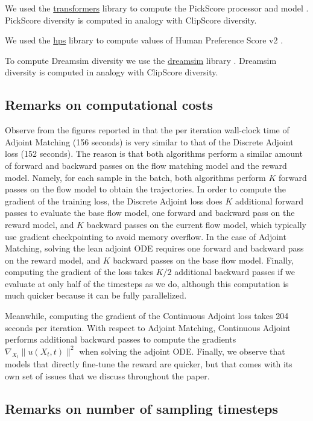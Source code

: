 We used the \url{transformers} library to compute the PickScore processor and model \citep{kirstain2023pickapic}. PickScore diversity is computed in analogy with ClipScore diversity.

We used the \url{hps} library to compute values of Human Preference Score v2 \citep{wu2023human}.

To compute Dreamsim diversity we use the \url{dreamsim} library \citep{fu2023learning}. Dreamsim diversity is computed in analogy with ClipScore diversity.

\subsection{Remarks on computational costs} \label{subsec:remarks_computational_cost}
Observe from the figures reported in  that the per iteration wall-clock time of Adjoint Matching (156 seconds) is very similar to that of the Discrete Adjoint loss (152 seconds). The reason is that both algorithms perform a similar amount of forward and backward passes on the flow matching model and the reward model. Namely, for each sample in the batch, both algorithms perform $K$ forward passes on the flow model to obtain the trajectories. In order to compute the gradient of the training loss, the Discrete Adjoint loss does $K$ additional forward passes to evaluate the base flow model, one forward and backward pass on the reward model, and $K$ backward passes on the current flow model, which typically use gradient checkpointing to avoid memory overflow. In the case of Adjoint Matching, solving the lean adjoint ODE requires one forward and backward pass on the reward model, and $K$ backward passes on the base flow model. Finally, computing the gradient of the loss takes $K/2$ additional backward passes if we evaluate at only half of the timesteps as we do, although this computation is much quicker because it can be fully parallelized.

Meanwhile, computing the gradient of the Continuous Adjoint loss takes 204 seconds per iteration. With respect to Adjoint Matching, Continuous Adjoint performs additional backward passes to compute the gradients $\nabla_{X_t} \|u(X_t,t)\|^2$ when solving the adjoint ODE. Finally, we observe that models that directly fine-tune the reward are quicker, but that comes with its own set of issues that we discuss throughout the paper.

\subsection{Remarks on number of sampling timesteps} \label{subsec:remarks_sampling_timesteps}

